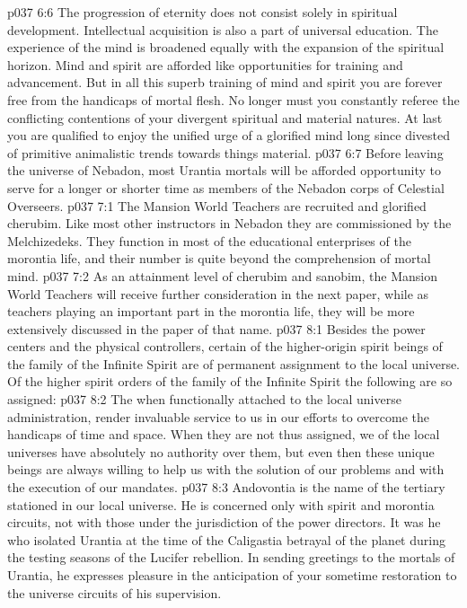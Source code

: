 \vs p037 6:6 The progression of eternity does not consist solely in spiritual development. Intellectual acquisition is also a part of universal education. The experience of the mind is broadened equally with the expansion of the spiritual horizon. Mind and spirit are afforded like opportunities for training and advancement. But in all this superb training of mind and spirit you are forever free from the handicaps of mortal flesh. No longer must you constantly referee the conflicting contentions of your divergent spiritual and material natures. At last you are qualified to enjoy the unified urge of a glorified mind long since divested of primitive animalistic trends towards things material.
\pc \vs p037 6:7 Before leaving the universe of Nebadon, most Urantia mortals will be afforded opportunity to serve for a longer or shorter time as members of the Nebadon corps of Celestial Overseers.
\vs p037 7:1 The Mansion World Teachers are recruited and glorified cherubim. Like most other instructors in Nebadon they are commissioned by the Melchizedeks. They function in most of the educational enterprises of the morontia life, and their number is quite beyond the comprehension of mortal mind.
\vs p037 7:2 As an attainment level of cherubim and sanobim, the Mansion World Teachers will receive further consideration in the next paper, while as teachers playing an important part in the morontia life, they will be more extensively discussed in the paper of that name.
\vs p037 8:1 Besides the power centers and the physical controllers, certain of the higher\hyp{}origin spirit beings of the family of the Infinite Spirit are of permanent assignment to the local universe. Of the higher spirit orders of the family of the Infinite Spirit the following are so assigned:
\pc \vs p037 8:2 The  when functionally attached to the local universe administration, render invaluable service to us in our efforts to overcome the handicaps of time and space. When they are not thus assigned, we of the local universes have absolutely no authority over them, but even then these unique beings are always willing to help us with the solution of our problems and with the execution of our mandates.
\vs p037 8:3 Andovontia is the name of the tertiary  stationed in our local universe. He is concerned only with spirit and morontia circuits, not with those under the jurisdiction of the power directors. It was he who isolated Urantia at the time of the Caligastia betrayal of the planet during the testing seasons of the Lucifer rebellion. In sending greetings to the mortals of Urantia, he expresses pleasure in the anticipation of your sometime restoration to the universe circuits of his supervision.
